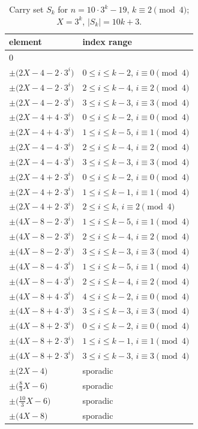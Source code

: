 \begin{table}[htbp]\centering\small
\caption{Carry set $S_k$ for $n=10\cdot 3^k - 19$, $k\equiv 2\pmod{4}$; $X=3^k$, $|S_k|=10k+3$.}
\begin{tabular}{ll}\toprule
element & index range \\ \midrule
$0$ & \\
$\pm\bigl(2X - 4 - 2\cdot 3^i\bigr)$ & $0\le i\le k-2$, $i\equiv 0\pmod 4$ \\
$\pm\bigl(2X - 4 - 2\cdot 3^i\bigr)$ & $2\le i\le k-4$, $i\equiv 2\pmod 4$ \\
$\pm\bigl(2X - 4 - 2\cdot 3^i\bigr)$ & $3\le i\le k-3$, $i\equiv 3\pmod 4$ \\
$\pm\bigl(2X - 4 + 4\cdot 3^i\bigr)$ & $0\le i\le k-2$, $i\equiv 0\pmod 4$ \\
$\pm\bigl(2X - 4 + 4\cdot 3^i\bigr)$ & $1\le i\le k-5$, $i\equiv 1\pmod 4$ \\
$\pm\bigl(2X - 4 - 4\cdot 3^i\bigr)$ & $2\le i\le k-4$, $i\equiv 2\pmod 4$ \\
$\pm\bigl(2X - 4 - 4\cdot 3^i\bigr)$ & $3\le i\le k-3$, $i\equiv 3\pmod 4$ \\
$\pm\bigl(2X - 4 + 2\cdot 3^i\bigr)$ & $0\le i\le k-2$, $i\equiv 0\pmod 4$ \\
$\pm\bigl(2X - 4 + 2\cdot 3^i\bigr)$ & $1\le i\le k-1$, $i\equiv 1\pmod 4$ \\
$\pm\bigl(2X - 4 + 2\cdot 3^i\bigr)$ & $2\le i\le k$, $i\equiv 2\pmod 4$ \\
$\pm\bigl(4X - 8 - 2\cdot 3^i\bigr)$ & $1\le i\le k-5$, $i\equiv 1\pmod 4$ \\
$\pm\bigl(4X - 8 - 2\cdot 3^i\bigr)$ & $2\le i\le k-4$, $i\equiv 2\pmod 4$ \\
$\pm\bigl(4X - 8 - 2\cdot 3^i\bigr)$ & $3\le i\le k-3$, $i\equiv 3\pmod 4$ \\
$\pm\bigl(4X - 8 - 4\cdot 3^i\bigr)$ & $1\le i\le k-5$, $i\equiv 1\pmod 4$ \\
$\pm\bigl(4X - 8 - 4\cdot 3^i\bigr)$ & $2\le i\le k-4$, $i\equiv 2\pmod 4$ \\
$\pm\bigl(4X - 8 + 4\cdot 3^i\bigr)$ & $4\le i\le k-2$, $i\equiv 0\pmod 4$ \\
$\pm\bigl(4X - 8 + 4\cdot 3^i\bigr)$ & $3\le i\le k-3$, $i\equiv 3\pmod 4$ \\
$\pm\bigl(4X - 8 + 2\cdot 3^i\bigr)$ & $0\le i\le k-2$, $i\equiv 0\pmod 4$ \\
$\pm\bigl(4X - 8 + 2\cdot 3^i\bigr)$ & $1\le i\le k-1$, $i\equiv 1\pmod 4$ \\
$\pm\bigl(4X - 8 + 2\cdot 3^i\bigr)$ & $3\le i\le k-3$, $i\equiv 3\pmod 4$ \\
$\pm\bigl(2X - 4\bigr)$ & sporadic \\
$\pm\bigl(\tfrac{8}{3}X - 6\bigr)$ & sporadic \\
$\pm\bigl(\tfrac{10}{3}X - 6\bigr)$ & sporadic \\
$\pm\bigl(4X - 8\bigr)$ & sporadic \\
\bottomrule\end{tabular}\end{table}

